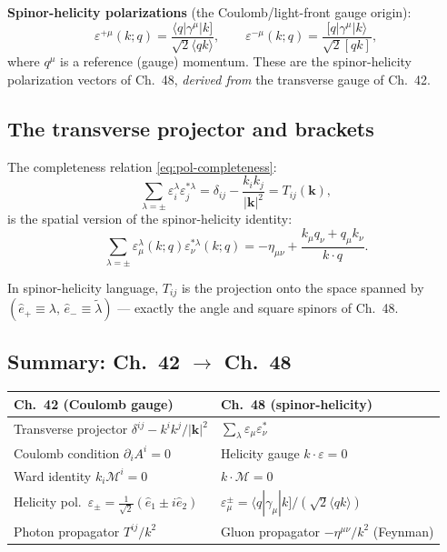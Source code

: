 \documentclass[12pt]{article}
\begin{document}
\begin{mdframed}[backgroundcolor=blue!5]
\textbf{Spinor-helicity polarizations} (the Coulomb/light-front gauge origin):
\begin{equation}\label{eq:helicity-pol-spinor}
  \varepsilon^{+\mu}(k;q) = \frac{\langle q|\gamma^\mu|k]}{\sqrt{2}\langle qk\rangle},
  \qquad
  \varepsilon^{-\mu}(k;q) = \frac{[q|\gamma^\mu|k\rangle}{\sqrt{2}[qk]},
\end{equation}
where $q^\mu$ is a reference (gauge) momentum.  These are the spinor-helicity
polarization vectors of Ch.~48, \emph{derived from} the transverse gauge
of Ch.~42.
\end{mdframed}

\subsection{The transverse projector and brackets}

The completeness relation \eqref{eq:pol-completeness}:
\begin{equation}
  \sum_{\lambda=\pm}\varepsilon_{i}^\lambda\varepsilon_j^{*\lambda}
  = \delta_{ij} - \frac{k_ik_j}{|\mathbf{k}|^2} = T_{ij}(\mathbf{k}),
\end{equation}
is the spatial version of the spinor-helicity identity:
\begin{equation}
  \sum_{\lambda=\pm}\varepsilon_\mu^\lambda(k;q)\varepsilon_\nu^{*\lambda}(k;q)
  = -\eta_{\mu\nu} + \frac{k_\mu q_\nu + q_\mu k_\nu}{k\cdot q}.
\end{equation}

In spinor-helicity language, $T_{ij}$ is the projection onto the space spanned by
$(\hat e_+ \equiv \lambda,\, \hat e_- \equiv \tilde\lambda)$ --- exactly the angle
and square spinors of Ch.~48.

\subsection{Summary: Ch.~42 $\to$ Ch.~48}

\begin{center}
\begin{tabular}{ll}
\toprule
Ch.~42 (Coulomb gauge) & Ch.~48 (spinor-helicity) \\
\midrule
Transverse projector $\delta^{ij}-k^ik^j/|\mathbf{k}|^2$ & $\sum_\lambda\varepsilon_\mu\varepsilon_\nu^*$ \\
Coulomb condition $\partial_i A^i=0$ & Helicity gauge $k\cdot\varepsilon=0$ \\
Ward identity $k_i\mathcal{M}^i=0$ & $k\cdot\mathcal{M}=0$ \\
Helicity pol.\ $\varepsilon_\pm = \frac{1}{\sqrt2}(\hat e_1\pm i\hat e_2)$ & $\varepsilon^\pm_\mu=\langle q|\gamma_\mu|k]/(\sqrt2\langle qk\rangle)$ \\
Photon propagator $T^{ij}/k^2$ & Gluon propagator $-\eta^{\mu\nu}/k^2$ (Feynman) \\
\bottomrule
\end{tabular}
\end{center}
\end{document}
